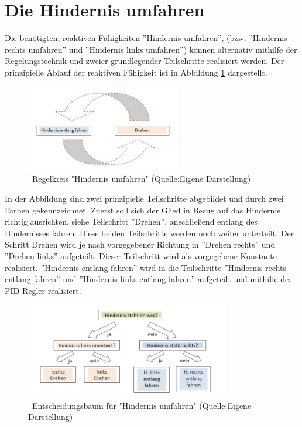 \renewcommand{\autoren}{Valentyn Chepil}
\newpage
\section{Die Hindernis umfahren}

Die benötigten, reaktiven Fähigkeiten ”Hindernis umfahren”, (bzw. ”Hindernis rechts umfahren” und ”Hindernis links umfahren”) können alternativ mithilfe der Regelungstechnik und zweier grundlegender Teilschritte realisiert werden. Der prinzipielle Ablauf der reaktiven Fähigkeit ist in Abbildung \ref{bild_HUR} dargestellt. 

\begin{figure}[!h]  %
	\centering\includegraphics[width=0.6\textwidth]{images/Bild_HUR.jpg}
	\caption{ \ Regelkreis "Hindernis umfahren" (Quelle:Eigene Darstellung)}
	\label{bild_HUR} %
\end{figure}

In der Abbildung sind zwei prinzipielle Teilschritte abgebildet und durch zwei Farben gekennzeichnet. Zuerst soll sich der Glied in Bezug auf das Hindernis richtig ausrichten, siehe Teilschritt ”Drehen”, anschließend entlang des Hindernisses fahren. Diese beiden Teilschritte werden noch weiter unterteilt. Der Schritt Drehen wird je nach vorgegebener Richtung in ”Drehen rechts” und ”Drehen links” aufgeteilt. Dieser Teilschritt wird als vorgegebene Konstante realisiert. ”Hindernis entlang fahren” wird in die Teilschritte ”Hindernis rechts entlang fahren” und ”Hindernis links entlang fahren” aufgeteilt und mithilfe der PID-Regler realisiert. 

\begin{figure}[!h]  %
	\centering\includegraphics[width=0.8\textwidth]{images/Entsch_baum.jpg}
	\caption{ \ Entscheidungsbaum für "Hindernis umfahren" (Quelle:Eigene Darstellung)}
	\label{baum} %
\end{figure}

